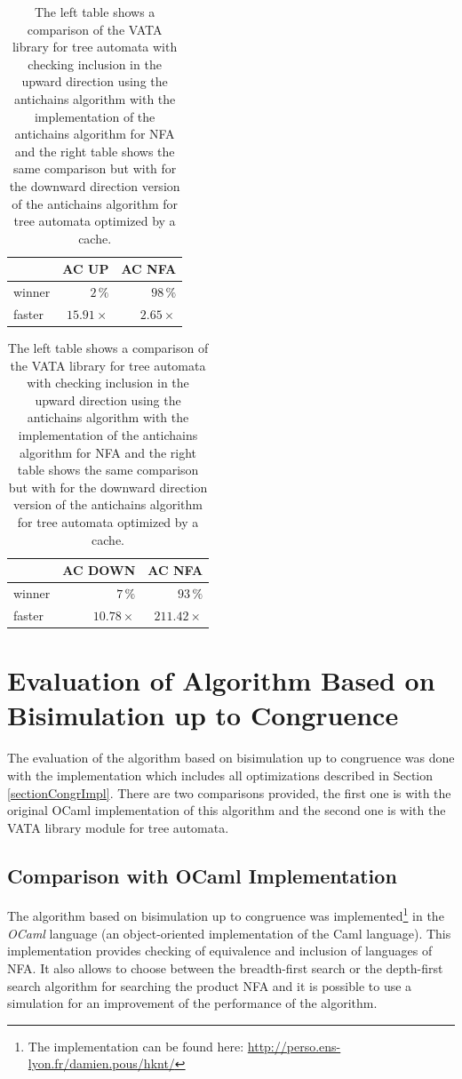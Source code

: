 \begin{table}
\begin{center}
\parbox{.45\linewidth}{
  \begin{tabular}[scale=0.3]{ | l | r | r |}
   \hline
    & \textbf{AC UP} & \textbf{AC NFA} \\ \hline \hline
    winner & $2\,\%$ & $98\,\%$ \\ \hline
    faster & $15.91\times$ & $2.65\times$ \\ \hline
   \end{tabular}
}
   \parbox{.45\linewidth}{
  \begin{tabular}{ | l | r | r |}
   \hline
    & \textbf{AC DOWN} & \textbf{AC NFA} \\ \hline \hline
    winner & $7\,\%$ & $93\,\%$ \\ \hline
    faster & $10.78\times$ & $211.42\times$ \\ \hline
   \end{tabular}
   }
   \caption{The left table shows a comparison of the VATA library for tree automata with checking inclusion in the 
     upward direction using the antichains algorithm with the implementation of the antichains algorithm for NFA and
   the right table shows the same comparison but with for the downward direction version of the antichains algorithm for tree automata optimized
   by a cache.}
   \label{tabAac}
\end{center}
\end{table}

\section{Evaluation of Algorithm Based on Bisimulation up to Congruence}
The evaluation of the algorithm based on bisimulation up to congruence was done with the implementation which includes all optimizations described in Section 
\ref{sectionCongrImpl}. There are two comparisons provided, the first one is with the original OCaml implementation of this algorithm \cite{popl13} 
and the second one is with the VATA library module for tree automata.

\subsection{Comparison with OCaml Implementation}
The algorithm based on bisimulation up to congruence was implemented\footnote{The implementation can be found here: \url{
http://perso.ens-lyon.fr/damien.pous/hknt/}} 
in the \emph{OCaml} language (an object-oriented implementation of the Caml language). 
This implementation provides checking of equivalence
and inclusion of languages of NFA. It also allows to choose between the breadth-first search or the depth-first search algorithm for searching the
product NFA and it is possible to use a simulation for an improvement of the performance of the algorithm.

